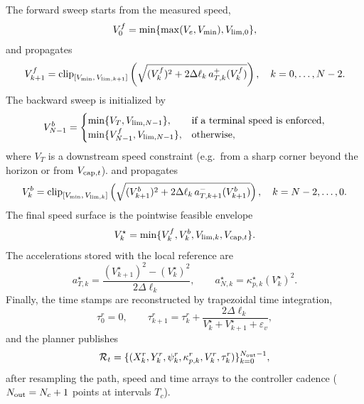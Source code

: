 \documentclass{iopjournal}
\begin{document}
The forward sweep starts from the measured speed,
\begin{equation}
V_0^f=\min\{\max(V_e,V_{\min}),V_{{\rm lim},0}\},
\label{eq:forward_init}
\end{equation}
and propagates
\begin{equation}
V_{k+1}^{f}
=
\operatorname{clip}_{[V_{\min},\,V_{{\rm lim},k+1}]}
\left(
\sqrt{(V_k^f)^2+2\Delta\ell_k\,a_{T,k}^{+}(V_k^f)}
\right),
\quad k=0,\ldots,N-2 .
\label{eq:vfwd}
\end{equation}
The backward sweep is initialized by
\begin{equation}
V_{N-1}^{b}=
\begin{cases}
\min\{V_T,V_{{\rm lim},N-1}\}, & \text{if a terminal speed is enforced},\\
\min\{V_{N-1}^{f},V_{{\rm lim},N-1}\}, & \text{otherwise},
\end{cases}
\label{eq:backward_init}
\end{equation}
where $V_T$ is a downstream speed constraint (e.g.\ from a sharp corner
beyond the horizon or from $V_{{\rm cap},t}$).
and propagates
\begin{equation}
V_{k}^{b}
=
\operatorname{clip}_{[V_{\min},\,V_{{\rm lim},k}]}
\left(
\sqrt{(V_{k+1}^{b})^2+2\Delta\ell_k\,a_{T,k+1}^{-}(V_{k+1}^{b})}
\right),
\quad k=N-2,\ldots,0 .
\label{eq:vbwd}
\end{equation}
The final speed surface is the pointwise feasible envelope
\begin{equation}
V_k^\star=\min\{V_k^f,V_k^b,V_{{\rm lim},k},V_{{\rm cap},t}\}.
\label{eq:vmerge}
\end{equation}
The accelerations stored with the local reference are
\begin{equation}
a_{T,k}^\star=
\frac{(V_{k+1}^\star)^2-(V_k^\star)^2}{2\Delta\ell_k},\qquad
a_{N,k}^\star=\kappa_{p,k}^\star(V_k^\star)^2 .
\label{eq:atan}
\end{equation}
Finally, the time stamps are reconstructed by trapezoidal time integration,
\begin{equation}
\tau_0^r=0,\qquad
\tau_{k+1}^r=\tau_k^r+
\frac{2\Delta\ell_k}{V_k^\star+V_{k+1}^\star+\varepsilon_v},
\label{eq:time_reconstruct}
\end{equation}
and the planner publishes
\begin{equation}
\mathcal{R}_t=
\{(X_k^r,Y_k^r,\psi_k^r,\kappa_{p,k}^r,V_k^r,\tau_k^r)\}_{k=0}^{N_{\rm out}-1},
\label{eq:reference_tuple}
\end{equation}
after resampling the path, speed and time arrays to the controller cadence
($N_{\rm out}=N_c+1$ points at intervals $T_c$).
\end{document}
